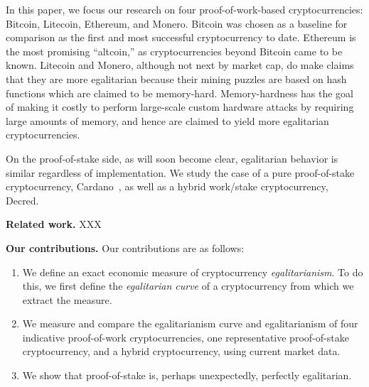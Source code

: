 In this paper, we focus our research on four proof-of-work-based
cryptocurrencies: Bitcoin, Litecoin, Ethereum, and Monero. Bitcoin was chosen as
a baseline for comparison as the first and most successful cryptocurrency to
date. Ethereum is the most promising ``altcoin,'' as cryptocurrencies beyond
Bitcoin came to be known. Litecoin and Monero, although not next by market cap,
do make claims that they are more egalitarian because their mining puzzles are
based on hash functions which are claimed to be memory-hard. Memory-hardness
has the goal of making it costly to perform large-scale custom hardware attacks
by requiring large amounts of memory, and hence are claimed to yield more
egalitarian cryptocurrencies.

On the proof-of-stake side, as will soon become clear, egalitarian behavior is
similar regardless of implementation. We study the case of a pure proof-of-stake
cryptocurrency, Cardano~\cite{C:KRDO17}, as well as a hybrid work/stake
cryptocurrency, Decred.

\noindent
\textbf{Related work.} XXX

\noindent
\textbf{Our contributions.}
Our contributions are as follows:

\begin{enumerate}
  \item We define an exact economic measure of cryptocurrency
        \emph{egalitarianism}.
        To do this, we first define the \emph{egalitarian curve} of a
        cryptocurrency from which we extract the measure.
  \item We measure and compare the egalitarianism curve and egalitarianism of
        four indicative proof-of-work cryptocurrencies, one representative
        proof-of-stake cryptocurrency, and a hybrid cryptocurrency, using
        current market data.
  \item We show that proof-of-stake is, perhaps unexpectedly, perfectly
        egalitarian.
\end{enumerate}
